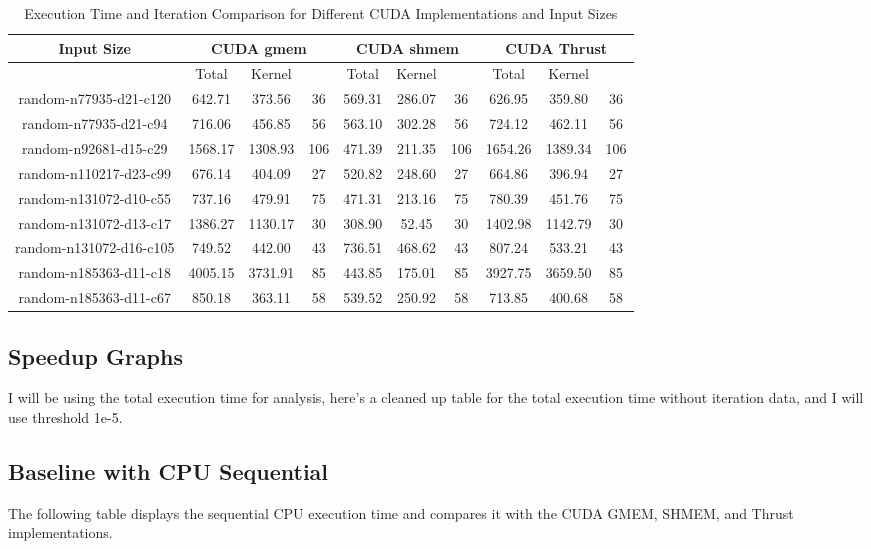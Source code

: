 \documentclass[letterpaper,12pt]{article}
\theoremstyle{remark}
\begin{document}
\begin{table}[ht]
\centering
\caption{Execution Time and Iteration Comparison for Different CUDA Implementations and Input Sizes}
\begin{tabular}{|c|c|c|c|c|c|c|c|c|c|}
\hline
\textbf{Input Size} & \multicolumn{3}{c|}{\textbf{CUDA gmem}} & \multicolumn{3}{c|}{\textbf{CUDA shmem}} & \multicolumn{3}{c|}{\textbf{CUDA Thrust}} \\
\hline
& Total & Kernel  &  & Total & Kernel &  & Total & Kernel &  \\
\hline
random-n77935-d21-c120 & 642.71 & 373.56 & 36 & 569.31 & 286.07 & 36 & 626.95 & 359.80 & 36 \\
random-n77935-d21-c94  & 716.06 & 456.85 & 56 & 563.10 & 302.28 & 56 & 724.12 & 462.11 & 56 \\
random-n92681-d15-c29  & 1568.17 & 1308.93 & 106 & 471.39 & 211.35 & 106 & 1654.26 & 1389.34 & 106 \\
random-n110217-d23-c99 & 676.14 & 404.09 & 27 & 520.82 & 248.60 & 27 & 664.86 & 396.94 & 27 \\
random-n131072-d10-c55 & 737.16 & 479.91 & 75 & 471.31 & 213.16 & 75 & 780.39 & 451.76 & 75 \\
random-n131072-d13-c17 & 1386.27 & 1130.17 & 30 & 308.90 & 52.45 & 30 & 1402.98 & 1142.79 & 30 \\
random-n131072-d16-c105 & 749.52 & 442.00 & 43 & 736.51 & 468.62 & 43 & 807.24 & 533.21 & 43 \\
random-n185363-d11-c18 & 4005.15 & 3731.91 & 85 & 443.85 & 175.01 & 85 & 3927.75 & 3659.50 & 85 \\
random-n185363-d11-c67 & 850.18 & 363.11 & 58 & 539.52 & 250.92 & 58 & 713.85 & 400.68 & 58 \\
\hline
\end{tabular}
\end{table}

\subsection{Speedup Graphs}
I will be using the total execution time for analysis, here's a cleaned up table for the total execution time without iteration data, and I will use threshold 1e-5.



\subsection{Baseline with CPU Sequential}
The following table displays the sequential CPU execution time and compares it with the CUDA GMEM, SHMEM, and Thrust implementations.
\clearpage
\end{document}
